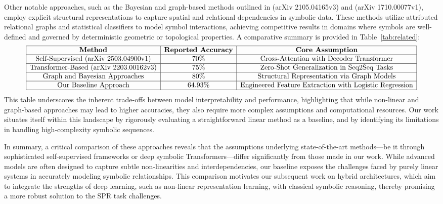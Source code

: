 \documentclass{article}
\begin{document}
Other notable approaches, such as the Bayesian and graph-based methods outlined in (arXiv 2105.04165v3) and (arXiv 1710.00077v1), employ explicit structural representations to capture spatial and relational dependencies in symbolic data. These methods utilize attributed relational graphs and statistical classifiers to model symbol interactions, achieving competitive results in domains where symbols are well-defined and governed by deterministic geometric or topological properties. A comparative summary is provided in Table~\ref{tab:related}:
\[
\begin{array}{|c|c|c|}
\hline
\textbf{Method} & \textbf{Reported Accuracy} & \textbf{Core Assumption} \\
\hline
\text{Self-Supervised (arXiv 2503.04900v1)} & 70\% & \text{Cross-Attention with Decoder Transformer} \\
\hline
\text{Transformer-Based (arXiv 2203.00162v3)} & 75\% & \text{Zero-Shot Generalization in Seq2Seq Tasks} \\
\hline
\text{Graph and Bayesian Approaches} & 80\% & \text{Structural Representation via Graph Models} \\
\hline
\text{Our Baseline Approach} & 64.93\% & \text{Engineered Feature Extraction with Logistic Regression} \\
\hline
\end{array}
\]
This table underscores the inherent trade-offs between model interpretability and performance, highlighting that while non-linear and graph-based approaches may lead to higher accuracies, they also require more complex assumptions and computational resources. Our work situates itself within this landscape by rigorously evaluating a straightforward linear method as a baseline, and by identifying its limitations in handling high-complexity symbolic sequences.

In summary, a critical comparison of these approaches reveals that the assumptions underlying state-of-the-art methods—be it through sophisticated self-supervised frameworks or deep symbolic Transformers—differ significantly from those made in our work. While advanced models are often designed to capture subtle non-linearities and interdependencies, our baseline exposes the challenges faced by purely linear systems in accurately modeling symbolic relationships. This comparison motivates our subsequent work on hybrid architectures, which aim to integrate the strengths of deep learning, such as non-linear representation learning, with classical symbolic reasoning, thereby promising a more robust solution to the SPR task challenges.
\end{document}
